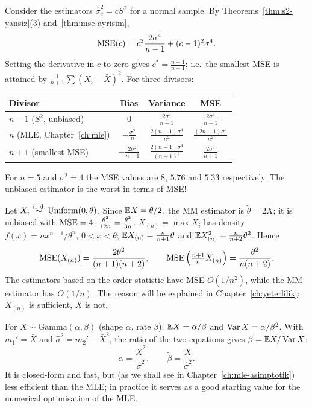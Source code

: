 \documentclass[main.tex]{subfiles}
\begin{document}
\begin{example}\label{ex:en-iyi-bolen}
Consider the estimators $\hat\sigma^2_c=cS^2$ for a normal sample. By Theorems~\ref{thm:s2-yansiz}(3) and~\ref{thm:mse-ayrisim},
\[
\operatorname{MSE}(c)=c^2\frac{2\sigma^4}{n-1}+(c-1)^2\sigma^4 .
\]
Setting the derivative in $c$ to zero gives $c^*=\frac{n-1}{n+1}$; i.e.\ the smallest MSE is attained by $\frac{1}{n+1}\sum(X_i-\bar X)^2$. For three divisors:
\begin{center}
\begin{tabular}{@{}lccc@{}}
\toprule
Divisor & Bias & Variance & MSE \\
\midrule
$n-1$ ($S^2$, unbiased) & $0$ & $\frac{2\sigma^4}{n-1}$ & $\frac{2\sigma^4}{n-1}$ \\[3pt]
$n$ (MLE, Chapter~\ref{ch:mle}) & $-\frac{\sigma^2}{n}$ & $\frac{2(n-1)\sigma^4}{n^2}$ & $\frac{(2n-1)\sigma^4}{n^2}$ \\[3pt]
$n+1$ (smallest MSE) & $-\frac{2\sigma^2}{n+1}$ & $\frac{2(n-1)\sigma^4}{(n+1)^2}$ & $\frac{2\sigma^4}{n+1}$ \\
\bottomrule
\end{tabular}
\end{center}
For $n=5$ and $\sigma^2=4$ the MSE values are $8$, $5.76$ and $5.33$ respectively. The unbiased estimator is the worst in terms of MSE!
\end{example}

\begin{example}\label{ex:uniform-uc}
Let $X_i\overset{\text{i.i.d.}}{\sim}\text{Uniform}(0,\theta)$. Since $\mathbb{E} X=\theta/2$, the MM estimator is $\tilde\theta=2\bar X$; it is unbiased with $\operatorname{MSE}=4\cdot\frac{\theta^2}{12n}=\frac{\theta^2}{3n}$.
$X_{(n)}=\max X_i$ has density $f(x)=nx^{n-1}/\theta^n$, $0<x<\theta$; $\mathbb{E} X_{(n)}=\frac{n}{n+1}\theta$ and $\mathbb{E} X_{(n)}^2=\frac{n}{n+2}\theta^2$. Hence
\[
\operatorname{MSE}(X_{(n)})=\frac{2\theta^2}{(n+1)(n+2)},\qquad \operatorname{MSE}\Big(\tfrac{n+1}{n}X_{(n)}\Big)=\frac{\theta^2}{n(n+2)} .
\]
The estimators based on the order statistic have MSE $O(1/n^2)$, while the MM estimator has $O(1/n)$. The reason will be explained in Chapter~\ref{ch:yeterlilik}: $X_{(n)}$ is sufficient, $\bar X$ is not.
\end{example}

\begin{example}\label{ex:gamma-mm}
For $X\sim\text{Gamma}(\alpha,\beta)$ (shape $\alpha$, rate $\beta$): $\mathbb{E} X=\alpha/\beta$ and $\operatorname{Var} X=\alpha/\beta^2$. With $m_1'=\bar X$ and $\hat\sigma^2=m_2'-\bar X^2$, the ratio of the two equations gives $\beta=\mathbb{E} X/\operatorname{Var} X$:
\[
\tilde\alpha=\frac{\bar X^2}{\hat\sigma^2},\qquad\tilde\beta=\frac{\bar X}{\hat\sigma^2}.
\]
It is closed-form and fast, but (as we shall see in Chapter~\ref{ch:mle-asimptotik}) less efficient than the MLE; in practice it serves as a good starting value for the numerical optimisation of the MLE.
\end{example}
\end{document}
